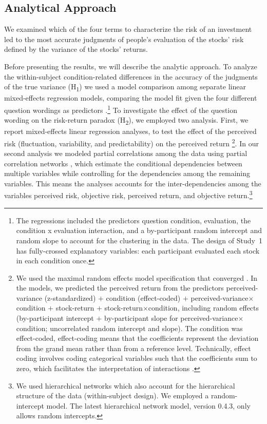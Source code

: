 \documentclass[a4paper,man, natbib,floatsintext]{apa6} %
\begin{document}
\subsection{Analytical Approach}

We examined which of the four terms to characterize the risk of an investment led to the most accurate judgments of people's evaluation of the stocks' risk defined by the variance of the stocks' returns. 



Before presenting the results, we will describe the analytic approach. To analyze the within-subject condition-related differences in the accuracy of the judgments of the true variance (H\textsubscript{1}) we used a model comparison among separate linear mixed-effects regression models, comparing the model fit given the four different question wordings as predictors \citep[following][]{Judd2017}.\footnote{The regressions included the predictors question condition, evaluation, the condition x evaluation interaction, and a by-participant random intercept and random slope to account for the clustering in the data. The design of Study~1 has fully-crossed explanatory variables: each participant evaluated each stock in each condition once.} To investigate the effect of the question wording on the risk-return paradox (H\textsubscript{2}), we employed two analysis. First, we report mixed-effects linear regression analyses, to test the effect of the perceived risk (fluctuation, variability, and predictability) on the perceived return \citep[following][]{Judd2017,Barr2013a}\footnote{We used the maximal random effects model specification that converged \citep[following][]{Judd2017,Barr2013a}. In the models, we predicted the perceived return from the predictors perceived-variance (z-standardized) $+$ condition (effect-coded) $+$ perceived-variance$\times$condition $+$ stock-return $+$ stock-return$\times$condition, including random effects (by-participant intercept $+$ by-participant slope for perceived-variance$\times$condition; uncorrelated random intercept and slope). The condition was effect-coded, effect-coding means that the coefficients represent the deviation from the grand mean rather than from a reference level. Technically, effect coding involves coding categorical variables such that the coefficients sum to zero, which facilitates the interpretation of interactions \citep[e.g.,][]{SingmannForthcoming}.}. In our second analysis we modeled partial correlations among the data using partial correlation networks \citep[e.g.,][]{Epskamp2019}, which estimate the conditional dependencies between multiple variables while controlling for the dependencies among the remaining variables. This means the analyses accounts for the inter-dependencies among the variables perceived risk, objective risk, perceived return, and objective return.\footnote{We used hierarchical networks which also account for the hierarchical structure of the data (within-subject design). We employed a random-intercept model. The latest hierarchical network model, version 0.4.3, only allows random intercepts.} 
\end{document}
